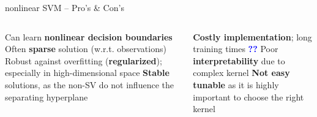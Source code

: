 
\begin{frame}{nonlinear SVM -- Pro's \& Con's}

\footnotesize

\begin{columns}[onlytextwidth]
  \begin{column}{0.5\textwidth}
    \footnotesize
    \begin{itemize}
      \positem Can learn \textbf{nonlinear decision boundaries}
      \positem Often \textbf{sparse} solution (w.r.t. observations)
      \positem Robust against overfitting (\textbf{regularized}); especially in 
      high-dimensional space 
      \positem \textbf{Stable} solutions, as the non-SV do not influence the 
      separating hyperplane
    \end{itemize}
  \end{column}

  \begin{column}{0.5\textwidth}
    \footnotesize
    \begin{itemize}
      \negitem \textbf{Costly implementation}; long training times
      \textcolor{blue}{\textbf{??}}
      \negitem Poor \textbf{interpretability} due to complex kernel
      \negitem \textbf{Not easy tunable} as it is highly important to choose the 
      right kernel
    \end{itemize}
  \end{column}
\end{columns}

\vfill

\small


\end{frame}


